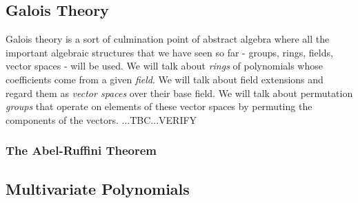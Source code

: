 




\subsection{Galois Theory}
Galois theory is a sort of culmination point of abstract algebra where all the important algebraic structures that we have seen so far - groups, rings, fields, vector spaces - will be used. We will talk about \emph{rings} of polynomials whose coefficients come from a given \emph{field}. We will talk about field extensions and regard them as \emph{vector spaces} over their base field. We will talk about permutation \emph{groups} that operate on elements of these vector spaces by permuting the components of the vectors. ...TBC...VERIFY



\subsubsection{The Abel-Ruffini Theorem} 





\subsection{Multivariate Polynomials}


